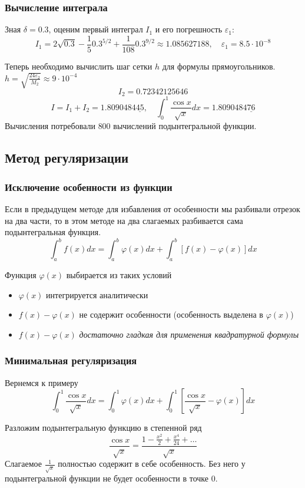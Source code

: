 \documentclass[apectratio=43,unicode]{beamer}
\begin{document}
\begin{frame}
\frametitle{Вычисление интеграла}
	Зная $\delta = 0.3$, оценим первый интеграл $I_1$ и его погрешность $\varepsilon_1$:
	\[
	I_1 = 2\sqrt{0.3} - \frac{1}{5}0.3^{5/2} + \frac{1}{108}0.3^{9/2} \approx
1.085627188, \quad\varepsilon_1 = 8.5 \cdot 10^{-8}
	\]

	Теперь необходимо вычислить шаг сетки $h$ для формулы прямоугольников. $h =
\sqrt{\frac{24\varepsilon_2}{M_2}} \approx 9\cdot 10^{-4}$
	\[
	I_2 = 0.72342125646
	\]
	\[
	I = I_1 + I_2 = 1.8090484\underline{45}, \quad \int_0^1 \frac{\cos
x}{\sqrt{x}} dx = 1.8090484\underline{76}
	\]
	Вычисления потребовали $800$ вычислений подынтегральной функции.
\end{frame}

\subsection{Метод регуляризации}
\begin{frame}
\frametitle{Исключение особенности из функции}
	Если в предыдущем методе для избавления от особенности мы разбивали отрезок на два части, то
	в этом методе на два слагаемых разбивается сама подынтегральная функция.
	\pause
	\[
	\int_a^b f(x) dx = \int_a^b \varphi(x) dx + \int_a^b [f(x) - \varphi(x)] dx
	\]
	\pause

	Функция $\varphi(x)$ выбирается из таких условий
	\begin{itemize}
		\item $\varphi(x)$ интегрируется аналитически
		\item $f(x)-\varphi(x)$ не содержит особенности (особенность выделена в $\varphi(x)$)
		\item $f(x)-\varphi(x)$ \emph{достаточно гладкая для применения квадратурной формулы}
	\end{itemize}
\end{frame}

\begin{frame}
\frametitle{Минимальная регуляризация}
	Вернемся к примеру
	\[
	\int_0^1 \frac{\cos x}{\sqrt{x}} dx =
	\int_0^1 \varphi(x) dx +
	\int_0^1 \left[\frac{\cos x}{\sqrt{x}}-\varphi(x)\right] dx
	\]
	\pause

	Разложим подынтегральную функцию в степенной ряд
	\[
	\frac{\cos x}{\sqrt{x}} = \frac{1-\frac{x^2}{2} + \frac{x^4}{24} + \dots}{\sqrt{x}}
	\]
	\pause
	Слагаемое $\frac{1}{\sqrt{x}}$ полностью содержит в себе особенность. Без него
	у подынтегральной функции не будет особенности в точке $0$.
\end{frame}
\end{document}
